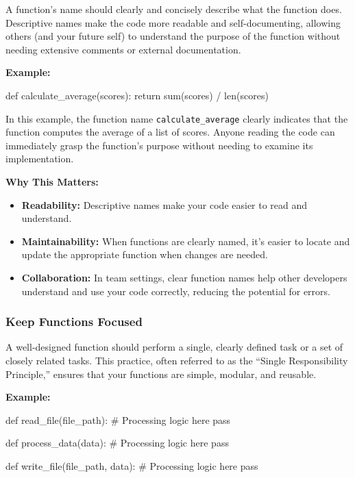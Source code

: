 \documentclass[
  letterpaper,
  DIV=11,
  numbers=noendperiod]{scrreprt}
\newenvironment{Shaded}{\begin{snugshade}}{\end{snugshade}}
\newcommand{\BuiltInTok}[1]{\textcolor[rgb]{0.00,0.23,0.31}{#1}}
\newcommand{\CommentTok}[1]{\textcolor[rgb]{0.37,0.37,0.37}{#1}}
\newcommand{\ControlFlowTok}[1]{\textcolor[rgb]{0.00,0.23,0.31}{#1}}
\newcommand{\KeywordTok}[1]{\textcolor[rgb]{0.00,0.23,0.31}{#1}}
\newcommand{\NormalTok}[1]{\textcolor[rgb]{0.00,0.23,0.31}{#1}}
\newcommand{\OperatorTok}[1]{\textcolor[rgb]{0.37,0.37,0.37}{#1}}
\providecommand{\tightlist}{%
  \setlength{\itemsep}{0pt}\setlength{\parskip}{0pt}}\usepackage{longtable,booktabs,array}
\begin{document}
A function's name should clearly and concisely describe what the
function does. Descriptive names make the code more readable and
self-documenting, allowing others (and your future self) to understand
the purpose of the function without needing extensive comments or
external documentation.

\textbf{Example:}

\begin{Shaded}
\begin{Highlighting}[]
\KeywordTok{def}\NormalTok{ calculate\_average(scores):}
    \ControlFlowTok{return} \BuiltInTok{sum}\NormalTok{(scores) }\OperatorTok{/} \BuiltInTok{len}\NormalTok{(scores)}
\end{Highlighting}
\end{Shaded}

In this example, the function name \texttt{calculate\_average} clearly
indicates that the function computes the average of a list of scores.
Anyone reading the code can immediately grasp the function's purpose
without needing to examine its implementation.

\textbf{Why This Matters:}

\begin{itemize}
\tightlist
\item
  \textbf{Readability:} Descriptive names make your code easier to read
  and understand.
\item
  \textbf{Maintainability:} When functions are clearly named, it's
  easier to locate and update the appropriate function when changes are
  needed.
\item
  \textbf{Collaboration:} In team settings, clear function names help
  other developers understand and use your code correctly, reducing the
  potential for errors.
\end{itemize}

\hypertarget{keep-functions-focused}{%
\subsubsection{Keep Functions Focused}\label{keep-functions-focused}}

A well-designed function should perform a single, clearly defined task
or a set of closely related tasks. This practice, often referred to as
the ``Single Responsibility Principle,'' ensures that your functions are
simple, modular, and reusable.

\textbf{Example:}

\begin{Shaded}
\begin{Highlighting}[]
\KeywordTok{def}\NormalTok{ read\_file(file\_path):}
    \CommentTok{\# Processing logic here}
    \ControlFlowTok{pass}

\KeywordTok{def}\NormalTok{ process\_data(data):}
    \CommentTok{\# Processing logic here}
    \ControlFlowTok{pass}

\KeywordTok{def}\NormalTok{ write\_file(file\_path, data):}
    \CommentTok{\# Processing logic here}
    \ControlFlowTok{pass}
\end{Highlighting}
\end{Shaded}
\end{document}
